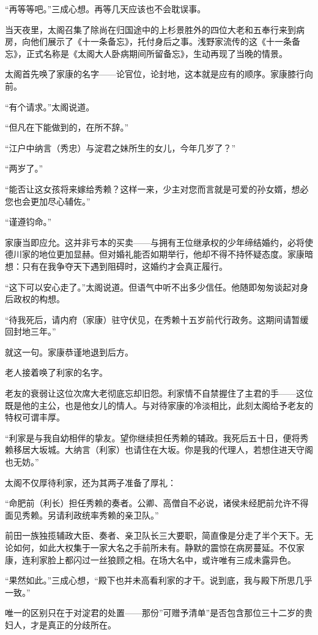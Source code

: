 \documentclass[
]{book}
\begin{document}
``再等等吧。''三成心想。再等几天应该也不会耽误事。

当天夜里，太阁召集了除尚在归国途中的上杉景胜外的四位大老和五奉行来到病房，向他们展示了《十一条备忘》，托付身后之事。浅野家流传的这《十一条备忘》，正式名称是《太阁大人卧病期间所留备忘》，生动再现了当晚的情景。

太阁首先唤了家康的名字------论官位，论封地，这本就是应有的顺序。家康膝行向前。

``有个请求。''太阁说道。

``但凡在下能做到的，在所不辞。''

``江户中纳言（秀忠）与淀君之妹所生的女儿，今年几岁了？''

``两岁了。''

``能否让这女孩将来嫁给秀赖？这样一来，少主对您而言就是可爱的孙女婿，想必您也会更加尽心辅佐。''

``谨遵钧命。''

家康当即应允。这并非亏本的买卖------与拥有王位继承权的少年缔结婚约，必将使德川家的地位更加显赫。但对婚礼能否如期举行，他却不得不持怀疑态度。家康暗想：只有在我争夺天下遇到阻碍时，这婚约才会真正履行。

``这下可以安心走了。''太阁说道。但语气中听不出多少信任。他随即匆匆谈起对身后政权的构想。

``待我死后，请内府（家康）驻守伏见，在秀赖十五岁前代行政务。这期间请暂缓回封地三年。''

就这一句。家康恭谨地退到后方。

老人接着唤了利家的名字。

老友的衰弱让这位次席大老彻底忘却旧怨。利家情不自禁握住了主君的手------这位既是他的主公，也是他女儿的情人。与对待家康的冷淡相比，此刻太阁给予老友的特权可谓丰厚。

``利家是与我自幼相伴的挚友。望你继续担任秀赖的辅政。我死后五十日，便将秀赖移居大坂城。大纳言（利家）也请住在大坂。你是我的代理人，若想住进天守阁也无妨。''

太阁不仅厚待利家，还为其两子准备了厚礼：

``命肥前（利长）担任秀赖的奏者。公卿、高僧自不必说，诸侯未经肥前允许不得面见秀赖。另请利政统率秀赖的亲卫队。''

前田一族独揽辅政大臣、奏者、亲卫队长三大要职，简直像是分走了半个天下。无论如何，如此大权集于一家大名之手前所未有。静默的震惊在病房蔓延。不仅家康，连利家脸上都闪过一丝狼顾之相。在场大名中，或许唯有三成未露异色。

``果然如此。''三成心想，``殿下也并未高看利家的才干。说到底，我与殿下所思几乎一致。''

唯一的区别只在于对淀君的处置------那份''可赠予清单''是否包含那位三十二岁的贵妇人，才是真正的分歧所在。
\end{document}
